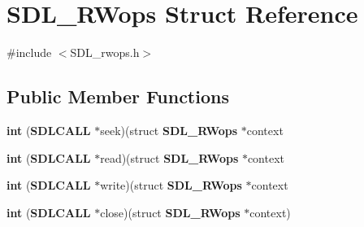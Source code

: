 \section{S\+D\+L\+\_\+\+R\+Wops Struct Reference}
\label{struct_s_d_l___r_wops}


{\ttfamily \#include $<$S\+D\+L\+\_\+rwops.\+h$>$}

\subsection*{Public Member Functions}
\begin{DoxyCompactItemize}
\item 
{\bf int} ({\bf S\+D\+L\+C\+A\+L\+L} $\ast$seek)(struct {\bf S\+D\+L\+\_\+\+R\+Wops} $\ast$context
\item 
{\bf int} ({\bf S\+D\+L\+C\+A\+L\+L} $\ast$read)(struct {\bf S\+D\+L\+\_\+\+R\+Wops} $\ast$context
\item 
{\bf int} ({\bf S\+D\+L\+C\+A\+L\+L} $\ast$write)(struct {\bf S\+D\+L\+\_\+\+R\+Wops} $\ast$context
\item 
{\bf int} ({\bf S\+D\+L\+C\+A\+L\+L} $\ast$close)(struct {\bf S\+D\+L\+\_\+\+R\+Wops} $\ast$context)
\end{DoxyCompactItemize}
